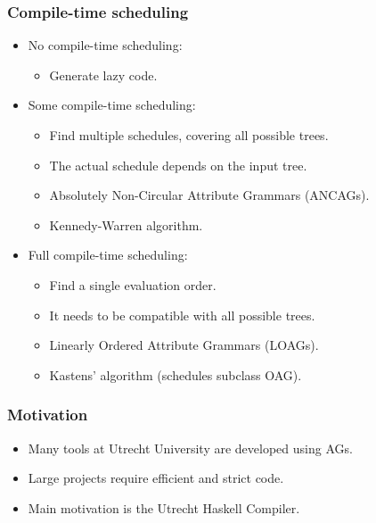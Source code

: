 \documentclass{beamer}
\begin{document}
\begin{frame}
    \frametitle{Compile-time scheduling}
    \begin{itemize}
        \item No compile-time scheduling: 
            \begin{itemize}
                \item Generate lazy code.
            \end{itemize}
        \item Some compile-time scheduling: 
            \begin{itemize}
                \item Find multiple schedules, covering all possible trees.
                \item The actual schedule depends on the input tree.
                \item Absolutely Non-Circular Attribute Grammars (ANCAGs).
                \item Kennedy-Warren algorithm.
            \end{itemize}
        \item Full compile-time scheduling:
            \begin{itemize}
                \item Find a single evaluation order.
                \item It needs to be compatible with all possible trees.
                \item Linearly Ordered Attribute Grammars (LOAGs).
                \item Kastens' algorithm (schedules subclass OAG).
            \end{itemize}
    \end{itemize}
\end{frame}

\begin{frame}
    \frametitle{Motivation}
    \begin{itemize}
        \item Many tools at Utrecht University are developed using AGs.
        \item Large projects require efficient and strict code.
        \item Main motivation is the Utrecht Haskell Compiler.         
    \end{itemize}
\end{frame}
\end{document}
